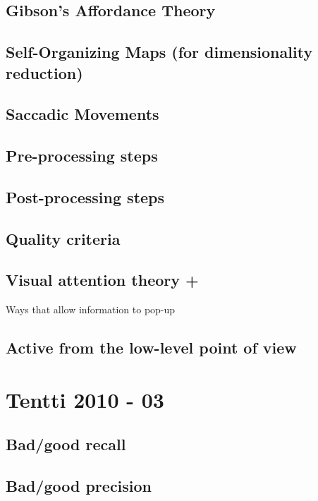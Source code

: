 \documentclass[a4paper]{article}
\begin{document}
\subsection{Gibson's Affordance Theory}

\subsection{Self-Organizing Maps (for dimensionality reduction)}

\subsection{Saccadic Movements}

\subsection{Pre-processing steps}

\subsection{Post-processing steps}

\subsection{Quality criteria}

\subsection{Visual attention theory +}

Ways that allow information to pop-up

\subsection{Active from the low-level point of view}

\section{Tentti 2010 - 03}

\subsection{Bad/good recall}

\subsection{Bad/good precision}
\end{document}
